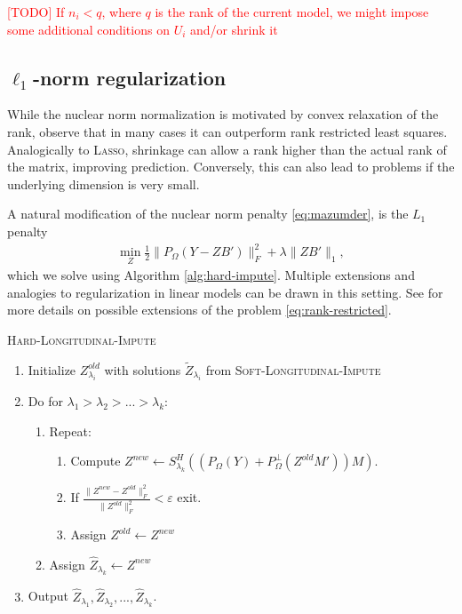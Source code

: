 \documentclass[preprint]{imsart}
\numberwithin{equation}{section}
\theoremstyle{plain}
\newcommand{\tr}[1]{{\textcolor{red}{#1}}}
\begin{document}
\tr{[TODO] If $n_i < q$, where $q$ is the rank of the current model, we might impose some additional conditions on $U_i$ and/or shrink it}



\subsection{$\ell_1$-norm regularization}

While the nuclear norm normalization is motivated by convex relaxation of the rank, \citet{mazumder2010spectral} observe that in many cases it can outperform rank restricted least squares. Analogically to \textsc{Lasso}, shrinkage can allow a rank higher than the actual rank of the matrix, improving prediction. Conversely, this can also lead to problems if the underlying dimension is very small.

A natural modification of the nuclear norm penalty \eqref{eq:mazumder}, is the $L_1$ penalty
\begin{align}\label{eq:matrixproblem-final-l1}
\min_{Z} \frac{1}{2} \|P_\Omega(Y - ZB')\|_F^2 + \lambda\|ZB'\|_1,
\end{align}
which we solve using Algorithm \ref{alg:hard-impute}. Multiple extensions and analogies to regularization in linear models can be drawn in this setting. See \citep{mazumder2010spectral} for more details on possible extensions of the problem \eqref{eq:rank-restricted}.

\begin{algorithm}
\caption{\textsc{Hard-Longitudinal-Impute}\label{alg:hard-impute}}
\begin{enumerate}
\item Initialize $Z^{old}_{\lambda_i}$ with solutions $\tilde{Z}_{\lambda_i}$ from \textsc{Soft-Longitudinal-Impute}
\item Do for $\lambda_1 > \lambda_2 > ... > \lambda_k$:
\begin{enumerate}
\item Repeat:
\begin{enumerate}
\item Compute $Z^{new} \leftarrow S_{\lambda_k}^H( (P_\Omega(Y) + P_\Omega^\perp(Z^{old}M'))M )$.
\item If $\frac{\|Z^{new} - Z^{old}\|_F^2}{\|Z^{old}\|_F^2} < \varepsilon$ exit.
\item Assign $Z^{old} \leftarrow Z^{new}$
\end{enumerate}
\item Assign $\hat{Z}_{\lambda_k} \leftarrow Z^{new}$
\end{enumerate}
\item Output $\hat{Z}_{\lambda_1}, \hat{Z}_{\lambda_2}, ... , \hat{Z}_{\lambda_k}$.
\end{enumerate}
\end{algorithm}
\end{document}
